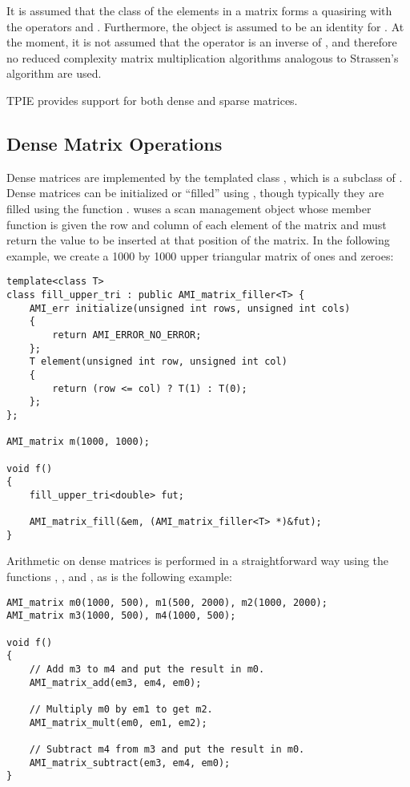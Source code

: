 It is assumed that the class  of the elements in a matrix forms a
quasiring with the operators \myverb{+} and \myverb{*}.  Furthermore, the
object  is assumed to be an identity for \myverb{+}.  At the
moment, it is not assumed that the operator
\myverb{-} is an inverse of \myverb{+}, and therefore no reduced
complexity matrix multiplication algorithms analogous to Strassen's
algorithm are used.

TPIE provides support for both dense and sparse matrices.

\subsection{Dense Matrix Operations}


Dense matrices are implemented by the templated class
,
which is a subclass of
.
Dense matrices can be initialized or ``filled'' using
, though typically they are filled using
the function .
 wuses a scan management object
whose member function  is given the row and
column of each element of the matrix and must return the
value to be inserted at that position of the matrix. In the
following example, we create a 1000 by 1000 upper triangular
matrix of ones and zeroes:

\begin{verbatim}
template<class T>
class fill_upper_tri : public AMI_matrix_filler<T> {
    AMI_err initialize(unsigned int rows, unsigned int cols)
    {
        return AMI_ERROR_NO_ERROR;
    };
    T element(unsigned int row, unsigned int col)
    {
        return (row <= col) ? T(1) : T(0);
    };
};

AMI_matrix m(1000, 1000);

void f()
{
    fill_upper_tri<double> fut;

    AMI_matrix_fill(&em, (AMI_matrix_filler<T> *)&fut);
}
\end{verbatim}

Arithmetic on dense matrices is performed in a straightforward way
using the functions ,
, and , as is
the following example:

\begin{verbatim}
AMI_matrix m0(1000, 500), m1(500, 2000), m2(1000, 2000);
AMI_matrix m3(1000, 500), m4(1000, 500);

void f()
{
    // Add m3 to m4 and put the result in m0.
    AMI_matrix_add(em3, em4, em0);
   
    // Multiply m0 by em1 to get m2.
    AMI_matrix_mult(em0, em1, em2);

    // Subtract m4 from m3 and put the result in m0.
    AMI_matrix_subtract(em3, em4, em0);        
}
\end{verbatim}

